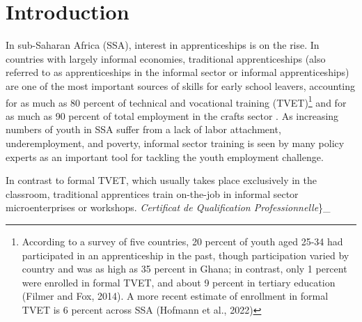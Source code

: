 \documentclass[
  a4paper, twoside, 12pt]{book}
\renewcommand{\hl}[1]{#1}
\newcommand{\hlc}[2][color]{}
\begin{document}
\newpage

\onehalfspacing

\hypertarget{cqp-intro}{%
\section{\texorpdfstring{\hl{Introduction}}{}}\label{cqp-intro}}


In sub-Saharan Africa (SSA), interest in apprenticeships is on the rise. In countries with largely informal economies, traditional apprenticeships (also referred to as apprenticeships in the informal sector or informal apprenticeships) are one of the most important sources of skills for early school leavers, accounting for as much as 80 percent of technical and vocational training (TVET)\footnote{According to a survey of five countries, 20 percent of youth aged 25-34 had participated in an apprenticeship in the past, though participation varied by country and was as high as 35 percent in Ghana; in contrast, only 1 percent were enrolled in formal TVET, and about 9 percent in tertiary education (Filmer and Fox, 2014). A more recent estimate of enrollment in formal TVET is 6 percent across SSA (Hofmann et al., 2022)} and for as much as 90 percent of total employment in the crafts sector \autocite{walther2007,adams2013,filmer2014,worldbank2018}. As increasing numbers of youth in SSA suffer from a lack of labor attachment, underemployment, and poverty, informal sector training is seen by many policy experts as an important tool for tackling the youth employment challenge.

In contrast to formal TVET, which usually takes place exclusively in the classroom, traditional apprentices train on-the-job in informal sector microenterprises or workshops. \hlc[lightgray]{An alternative reform is the introduction of a classroom component to an otherwise informal apprenticeship, producing a hybrid "dual system" comparable to that of the Swiss and German variety }\autocite{walther2011}\hlc[lightgray]{. Dual systems promise to increase training quality by introducing a state-regulated classroom component, while also improving the signalling ability of apprentices by offering official, nationally-recognized certification. In this paper, we analyze the impact of a such national dual system program on participating apprentices and firms in Bénin. The program, called }\emph{Certificat de Qualification Professionnelle}\}\_\hlc[lightgray]{ (CQP), appends weekly classroom training at a local training center to otherwise traditional in-firm apprenticeship training in an informal firm. Using two waves of apprentice-firm survey data collected for 427 apprentices training in 197 firms, we assess the impact of this weekly classroom training component on learning outcomes, use an accounting approach to estimate net material benefits of training for both apprentices and firms, and estimate the marginal effect of apprentice participation in dual system training on firm size and profits.} 
\end{document}
